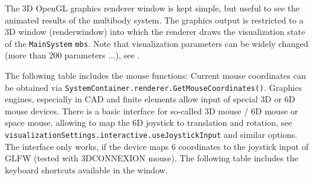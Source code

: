 %
%
The 3D OpenGL graphics renderer window is kept simple, but useful to see the animated results of the multibody system.
The graphics output is restricted to a 3D window (renderwindow) into which the renderer draws the visualization state of the \texttt{MainSystem} \texttt{mbs}.
Note that visualization parameters can be widely changed (more than 200 parameters ...), see .


The following table includes the mouse functions:
%
\finishTable
%
Current mouse coordinates can be obtained via \texttt{SystemContainer.renderer.GetMouseCoordinates()}.
%
Graphics engines, especially in CAD and finite elements allow input of special 3D or 6D mouse devices.
There is a basic interface for so-called 3D mouse / 6D mouse or space mouse, allowing to map the 6D joystick to translation and rotation,
see \texttt{visualizationSettings.interactive.useJoystickInput} and similar options.
The interface only works, if the device maps 6 coordinates to the joystick input of GLFW (tested with 3DCONNEXION mouse).
The following table includes the keyboard shortcuts available in the window. 

